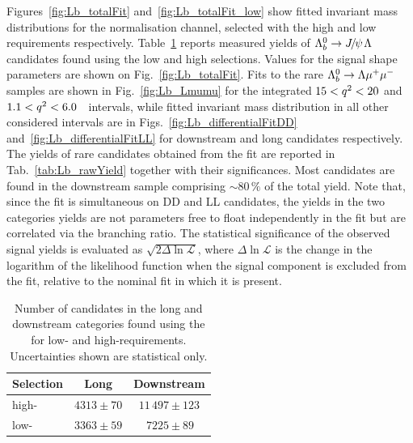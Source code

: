 %
Figures~\ref{fig:Lb_totalFit} and~\ref{fig:Lb_totalFit_low} show fitted invariant mass distributions for the normalisation channel,
selected with the high \qsq and low \qsq requirements respectively.
Table~\ref{tab:Lb_rawYieldJpsi} reports measured yields of $\Lb\ra\jpsi\Lz$ candidates found using the low 
and high \qsq selections. Values for the signal shape parameters are shown on Fig.~\ref{fig:Lb_totalFit}.
Fits to the rare $\Lambda^0_b\rightarrow\Lambda\mu^+\mu^-$ samples are shown in Fig.~\ref{fig:Lb_Lmumu} for the integrated
$15 < q^2 < 20$ and $1.1 < q^2 < 6.0$~\gevgevcccc ~\qsq intervals, while
fitted invariant mass distribution in all other considered \qsq intervals are in Figs.~\ref{fig:Lb_differentialFitDD}
and~\ref{fig:Lb_differentialFitLL} for downstream and long candidates respectively.
The yields of rare candidates obtained from the fit are reported in Tab.~\ref{tab:Lb_rawYield} together with their significances.
Most candidates are found in the downstream sample comprising $\sim 80\,\%$ of the total yield.
Note that, since the fit is simultaneous on DD and LL candidates, the yields in the two categories yields
are not parameters free to float independently in the fit but are correlated via the branching ratio.
The statistical significance of the observed signal yields is evaluated as $\sqrt{2\Delta\ln{\mathcal{L}}}$, where
$\Delta\ln{\mathcal{L}}$ is the change in the logarithm of the likelihood function when the signal component
is excluded from the fit, relative to the nominal fit in which it is present.

\begin{table}
\centering
\caption{Number of \decay{\Lb}{\jpsi\Lz} candidates in the long and
  downstream categories found using the for low- and
  high-\qsq requirements. Uncertainties shown are statistical only.}
\begin{tabular}{lcc}
Selection & Long & Downstream					\\ \hline
high-\qsq	& $4313 \pm 70$	 	&  $11\,497 \pm 123$ \\
low-\qsq	& $3363 \pm 59$ 	&  $\phantom{0}\,7225 \pm 89\phantom{0}$  \\
 \hline
\end{tabular}
\label{tab:Lb_rawYieldJpsi}
\end{table}



